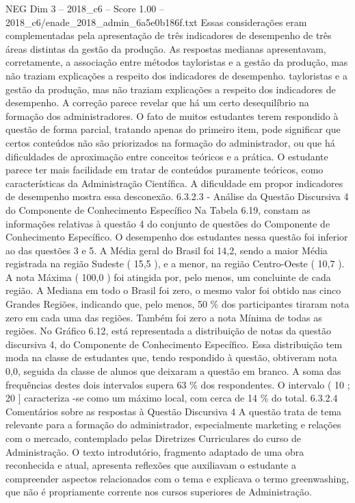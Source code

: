 \begin{textsample}{NEG Dim 3 – 2018\_c6 – Score 1.00 – 2018\_c6/enade\_2018\_admin\_6a5e0b186f.txt}
Essas considerações eram complementadas pela apresentação de três indicadores de desempenho de três áreas distintas da gestão da produção.
As respostas medianas apresentavam, corretamente, a associação entre métodos tayloristas e a gestão da produção, mas não traziam explicações a respeito dos indicadores de desempenho. tayloristas e a gestão da produção, mas não traziam explicações a respeito dos indicadores de desempenho.
A correção parece revelar que há um certo desequilíbrio na formação dos administradores.
O fato de muitos estudantes terem respondido à questão de forma parcial, tratando apenas do primeiro item, pode significar que certos conteúdos não são priorizados na formação do administrador, ou que há dificuldades de aproximação entre conceitos teóricos e a prática.
O estudante parece ter mais facilidade em tratar de conteúdos puramente teóricos, como características da Administração Científica.
A dificuldade em propor indicadores de desempenho mostra essa desconexão. 6.3.2.3 - Análise da Questão Discursiva 4 do Componente de Conhecimento Específico Na Tabela 6.19, constam as informações relativas à questão 4 do conjunto de questões do Componente de Conhecimento Específico.
O desempenho dos estudantes nessa questão foi inferior ao das questões 3 e 5.
A Média geral do Brasil foi 14,2, sendo a maior Média registrada na região Sudeste ( 15,5 ), e a menor, na região Centro-Oeste ( 10,7 ).
A nota Máxima ( 100,0 ) foi atingida por, pelo menos, um concluinte de cada região.
A Mediana em todo o Brasil foi zero, o mesmo valor foi obtido nas cinco Grandes Regiões, indicando que, pelo menos, 50 \% dos participantes tiraram nota zero em cada uma das regiões.
Também foi zero a nota Mínima de todas as regiões.
No Gráfico 6.12, está representada a distribuição de notas da questão discursiva 4, do Componente de Conhecimento Específico.
Essa distribuição tem moda na classe de estudantes que, tendo respondido à questão, obtiveram nota 0,0, seguida da classe de alunos que deixaram a questão em branco.
A soma das frequências destes dois intervalos supera 63 \% dos respondentes.
O intervalo ( 10 ; 20 ] caracteriza -se como um máximo local, com cerca de 14 \% do total. 6.3.2.4 Comentários sobre as respostas à Questão Discursiva 4 A questão trata de tema relevante para a formação do administrador, especialmente marketing e relações com o mercado, contemplado pelas Diretrizes Curriculares do curso de Administração.
O texto introdutório, fragmento adaptado de uma obra reconhecida e atual, apresenta reflexões que auxiliavam o estudante a compreender aspectos relacionados com o tema e explicava o termo greenwashing, que não é propriamente corrente nos cursos superiores de Administração.

\end{textsample}
